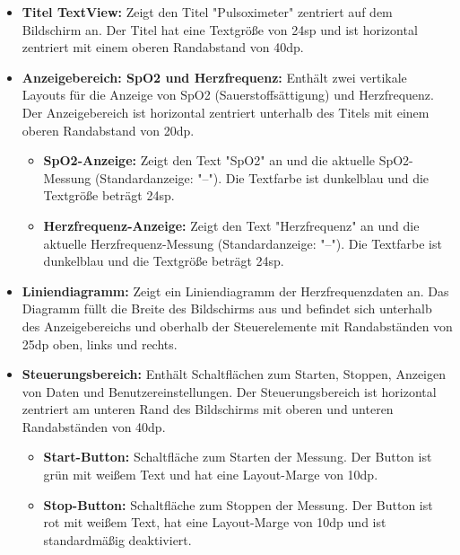 \documentclass[conference,a4paper,flushend]{cs-techrep}
\begin{document}
\begin{itemize}
    \vspace{0.5em}
    \item \textbf{Titel TextView:} Zeigt den Titel "Pulsoximeter" zentriert auf dem Bildschirm an. Der Titel hat eine Textgröße von 24sp und ist horizontal zentriert mit einem oberen Randabstand von 40dp.
    \vspace{0.5em}
    \item \textbf{Anzeigebereich: SpO2 und Herzfrequenz:} Enthält zwei vertikale Layouts für die Anzeige von SpO2 (Sauerstoffsättigung) und Herzfrequenz. Der Anzeigebereich ist horizontal zentriert unterhalb des Titels mit einem oberen Randabstand von 20dp.
    \vspace{0.5em}
    \begin{itemize}
        \item \textbf{SpO2-Anzeige:} Zeigt den Text "SpO2" an und die aktuelle SpO2-Messung (Standardanzeige: "--"). Die Textfarbe ist dunkelblau und die Textgröße beträgt 24sp.
        \vspace{0.5em}
        \item \textbf{Herzfrequenz-Anzeige:} Zeigt den Text "Herzfrequenz" an und die aktuelle Herzfrequenz-Messung (Standardanzeige: "--"). Die Textfarbe ist dunkelblau und die Textgröße beträgt 24sp.
    \end{itemize}
    \vspace{0.5em}
    \item \textbf{Liniendiagramm:} Zeigt ein Liniendiagramm der Herzfrequenzdaten an. Das Diagramm füllt die Breite des Bildschirms aus und befindet sich unterhalb des Anzeigebereichs und oberhalb der Steuerelemente mit Randabständen von 25dp oben, links und rechts.
    \vspace{0.5em}
    \item \textbf{Steuerungsbereich:} Enthält Schaltflächen zum Starten, Stoppen, Anzeigen von Daten und Benutzereinstellungen. Der Steuerungsbereich ist horizontal zentriert am unteren Rand des Bildschirms mit oberen und unteren Randabständen von 40dp.
    \vspace{0.5em}
    \begin{itemize}
        \item \textbf{Start-Button:} Schaltfläche zum Starten der Messung. Der Button ist grün mit weißem Text und hat eine Layout-Marge von 10dp.
        \vspace{0.5em}
        \item \textbf{Stop-Button:} Schaltfläche zum Stoppen der Messung. Der Button ist rot mit weißem Text, hat eine Layout-Marge von 10dp und ist standardmäßig deaktiviert.

\end{itemize}
\end{itemize}
\end{document}
